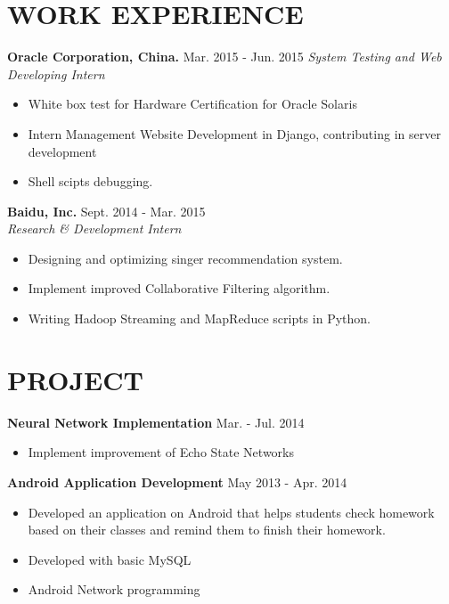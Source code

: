 \documentclass[margin,10pt]{res} %
\begin{document}
\begin{resume}
\section{WORK EXPERIENCE}
\leftmargini=4mm
{\bf Oracle Corporation, China.} \hfill Mar. 2015 - Jun. 2015 
\textit{System Testing and Web Developing Intern}
\begin{itemize}
\item White box test for Hardware Certification for Oracle Solaris
\item Intern Management Website Development in Django, contributing in server development
\item Shell scipts debugging.
\end{itemize}

{\bf Baidu, Inc.} \hfill Sept. 2014 - Mar. 2015 \\
\textit{Research & Development Intern}
\begin{itemize}  %
\item Designing and optimizing singer recommendation system.
\item Implement improved Collaborative Filtering algorithm.
\item Writing Hadoop Streaming and MapReduce scripts in Python. 
\end{itemize}

\section{PROJECT}
{\bf Neural Network Implementation} \hfill Mar. - Jul. 2014\\

\begin{itemize}  %
\item Implement improvement of Echo State Networks
\end{itemize}


{\bf Android Application Development} \hfill May 2013 - Apr. 2014 \\
\begin{itemize}
\item Developed an application on Android that helps students check homework based on their classes and remind them to finish their homework.
\item Developed with basic MySQL
\item Android Network programming
\end{itemize}



\end{resume}
\end{document}
